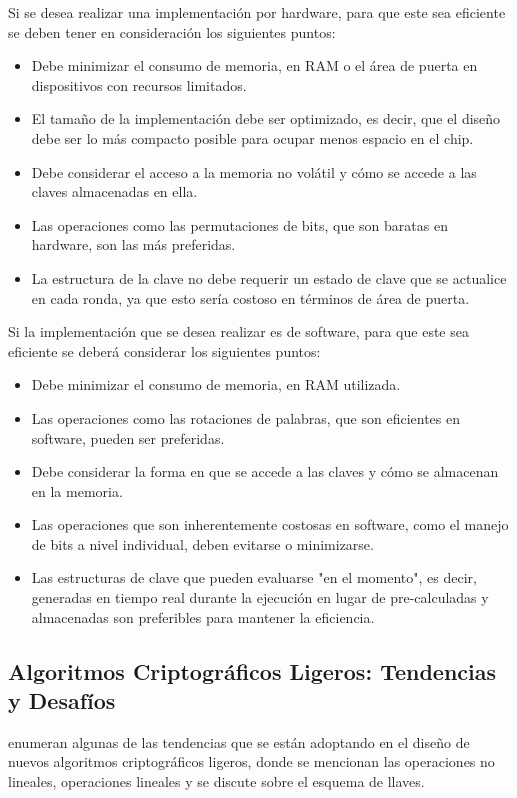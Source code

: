 \documentclass[a4paper,10pt]{article}
\begin{document}
	Si se desea realizar una implementación por hardware, para que este sea eficiente se deben tener en consideración los siguientes puntos:
	\begin{itemize}
		\item Debe minimizar el consumo de memoria, en RAM o el área de puerta en dispositivos con recursos limitados.
		\item El tamaño de la implementación debe ser optimizado, es decir, que el diseño debe ser lo más compacto posible para ocupar menos espacio en el chip.
		\item Debe considerar el acceso a la memoria no volátil y cómo se accede a las claves almacenadas en ella.
		\item Las operaciones como las permutaciones de bits, que son baratas en hardware, son las más preferidas.
		\item La estructura de la clave no debe requerir un estado de clave que se actualice en cada ronda, ya que esto sería costoso en términos de área de puerta.
	\end{itemize}
	Si la implementación que se desea realizar es de software, para que este sea eficiente se deberá considerar los siguientes puntos:
	\begin{itemize}
		\item Debe minimizar el consumo de memoria, en RAM utilizada.
		\item Las operaciones como las rotaciones de palabras, que son eficientes en software, pueden ser preferidas.
		\item Debe considerar la forma en que se accede a las claves y cómo se almacenan en la memoria.
		\item Las operaciones que son inherentemente costosas en software, como el manejo de bits a nivel individual, deben evitarse o minimizarse.
		\item Las estructuras de clave que pueden evaluarse "en el momento", es decir, generadas en tiempo real durante la ejecución en lugar de pre-calculadas y almacenadas son preferibles para mantener la eficiencia.
	\end{itemize}
	\subsection{Algoritmos Criptográficos Ligeros: Tendencias y Desafíos}
	\label{sec.2.3}
	\textcite{biryukov2017state} enumeran algunas de las tendencias que se están adoptando en el diseño de nuevos algoritmos criptográficos ligeros, donde se mencionan las operaciones no lineales, operaciones lineales y se discute sobre el esquema de llaves.
	
\end{document}
